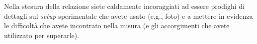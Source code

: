 \documentclass{lab1-article}
\begin{document}
\begin{article}
Nella stesura della relazione siete caldamente incoraggiati ad essere prodighi
di dettagli sul \emph{setup} sperimentale che avete usato (e.g., foto) e a
mettere in evidenza le difficolt\`a che avete incontrato nella misura
(e gli accorgimenti che avete utilizzato per superarle).

\onecolumn




\end{article}
\end{document}
